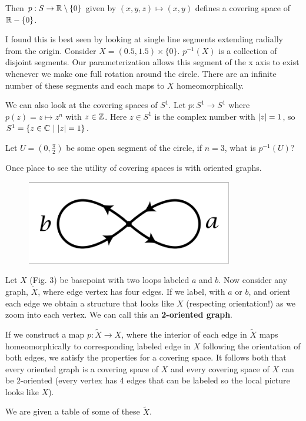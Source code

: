 \documentclass[10pt]{article}
\begin{document}
Then $p: S \to \mathbb{R} \setminus \{0\}$ given by $(x, y, z) \mapsto (x, y)$ defines a
covering space of $\mathbb{R} - \{ 0 \}$.

I found this is best seen by looking at single line segments extending radially
from the origin. Consider $X = (0.5, 1.5) \times \{0\}$. $p^{-1}(X)$ is a
collection of disjoint segments. Our parameterization allows this segment of
the x axis to exist whenever we make one full rotation around the circle. There
are an infinite number of these segments and each maps to $X$ homeomorphically.

We can also look at the covering spaces of $S^1$. Let $p: S^1 \to S^1$ where
$p(z) = z \mapsto z^n$ with $z \in \mathbb{Z}$. Here $z \in S^1$ is the complex number
with $\lvert z\rvert = 1$, so $S^1 = \{ z \in \mathbb{C} ~|~ \lvert z\rvert = 1\}$.

Let $U = (0, \frac{\pi}{2})$ be some open segment of the circle, if $n=3$, what is
$p^{-1}(U)$?

Once place to see the utility of covering spaces is with oriented graphs.

\begin{figure}[ht!]
\centering
\includegraphics[width=90mm]{./2-oriented.png}
\caption{}
\end{figure}


Let $X$ (Fig. 3) be basepoint with two loops labeled $a$ and $b$. Now consider any
graph, $\tilde{X}$, where edge vertex has four edges. If we label, with $a$ or
$b$, and orient each edge we obtain a structure that looks like $X$ (respecting
orientation!) as we zoom into each vertex. We can call this an \textbf{2-oriented graph}.

If we construct a map $p: \tilde{X} \to X$, where the interior of each edge in 
$\tilde{X}$ maps homeomorphically to corresponding labeled edge in $X$
following the orientation of both edges, we satisfy the properties for a covering
space. It follows both that every oriented graph is a covering space of $X$ and
every covering space of $X$ can be 2-oriented (every vertex has 4 edges that
can be labeled so the local picture looks like $X$).

We are given a table of some of these $\tilde{X}$.
\end{document}

